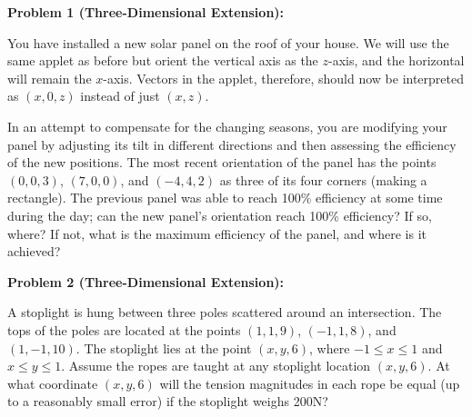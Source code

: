 \documentclass{ximera}
\begin{document}
\textbf{Problem 1 (Three-Dimensional Extension):}

You have installed a new solar panel on the roof of your house. We will use the same applet as before but orient the vertical axis as the $z$-axis, and the horizontal will remain the $x$-axis. Vectors in the applet, therefore, should now be interpreted as $\left(x,0,z\right)$ instead of just $\left(x,z\right)$.

In an attempt to compensate for the changing seasons, you are modifying your panel by adjusting its tilt in different directions and then assessing the efficiency of the new positions. The most recent orientation of the panel has the points $\left(0,0,3\right)$, $\left(7,0,0\right)$, and $\left(-4,4,2\right)$ as three of its four corners (making a rectangle). The previous panel was able to reach 100\% efficiency at some time during the day; can the new panel's orientation reach 100\% efficiency? If so, where? If not, what is the maximum efficiency of the panel, and where is it achieved?

\textbf{Problem 2 (Three-Dimensional Extension):}

A stoplight is hung between three poles scattered around an intersection. The tops of the poles are located at the points $\left(1,1,9\right)$, $\left(-1,1,8\right)$, and $\left(1,-1,10\right)$. The stoplight lies at the point $\left(x,y,6\right)$, where $-1\leq x\leq1$ and $x\leq y\leq1$. Assume the ropes are taught at any stoplight location $\left(x,y,6\right)$. At what coordinate $\left(x,y,6\right)$ will the tension magnitudes in each rope be equal (up to a reasonably small error) if the stoplight weighs 200N?
\end{document}
